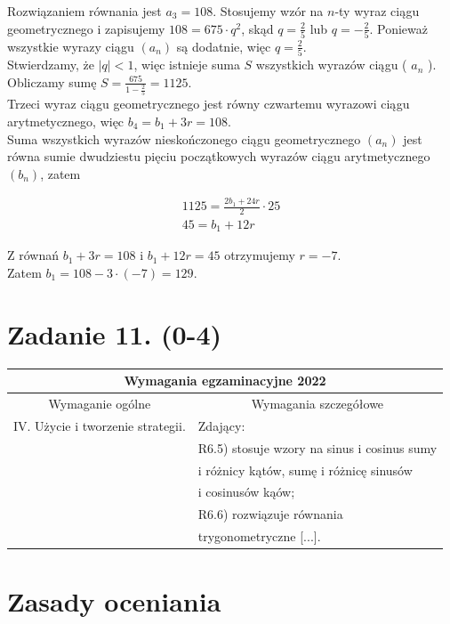 \documentclass[10pt]{article}
\begin{document}
Rozwiązaniem równania jest $a_{3}=108$. Stosujemy wzór na $n$-ty wyraz ciągu\\
geometrycznego i zapisujemy $108=675 \cdot q^{2}$, skąd $q=\frac{2}{5}$ lub $q=-\frac{2}{5}$. Ponieważ wszystkie wyrazy ciągu $\left(a_{n}\right)$ są dodatnie, więc $q=\frac{2}{5}$.\\
Stwierdzamy, że $|q|<1$, więc istnieje suma $S$ wszystkich wyrazów ciągu ( $a_{n}$ ). Obliczamy sumę $S=\frac{675}{1-\frac{2}{5}}=1125$.\\
Trzeci wyraz ciągu geometrycznego jest równy czwartemu wyrazowi ciągu arytmetycznego, więc $b_{4}=b_{1}+3 r=108$.\\
Suma wszystkich wyrazów nieskończonego ciągu geometrycznego $\left(a_{n}\right)$ jest równa sumie dwudziestu pięciu początkowych wyrazów ciągu arytmetycznego $\left(b_{n}\right)$, zatem

$$
\begin{gathered}
1125=\frac{2 b_{1}+24 r}{2} \cdot 25 \\
45=b_{1}+12 r
\end{gathered}
$$

Z równań $b_{1}+3 r=108$ i $b_{1}+12 r=45$ otrzymujemy $r=-7$.\\
Zatem $b_{1}=108-3 \cdot(-7)=129$.

\section*{Zadanie 11. (0-4)}
\begin{center}
\begin{tabular}{|l|l|}
\hline
\multicolumn{2}{|c|}{Wymagania egzaminacyjne 2022} \\
\hline
\multicolumn{1}{|c|}{Wymaganie ogólne} & \multicolumn{1}{c|}{Wymagania szczegółowe} \\
\hline
IV. Użycie i tworzenie strategii. & Zdający: \\
 & R6.5) stosuje wzory na sinus i cosinus sumy \\
 & i różnicy kątów, sumę i różnicę sinusów \\
 & i cosinusów kąów; \\
 & R6.6) rozwiązuje równania \\
 & trygonometryczne [...]. \\
\hline
\end{tabular}
\end{center}

\section*{Zasady oceniania}
\end{document}
